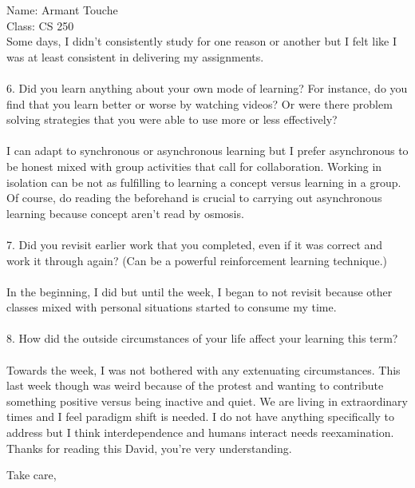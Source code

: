 \documentclass{letter}
\begin{document}
\begin{letter}{Name: Armant Touche \\ Class: CS 250 
\\ }
Some days, I didn't consistently study for one reason or another but I felt like I was at least consistent in delivering my assignments.\\\\
6. Did you learn anything about your own mode of learning? For instance, do you find that you learn better or worse by watching videos? Or were there problem solving strategies that you were able to use more or less effectively?\\\\
I can adapt to synchronous or asynchronous learning but I prefer asynchronous to be honest mixed with group activities that call for collaboration. Working in isolation can be not as fulfilling to learning a concept versus learning in a group. Of course, do reading the beforehand is crucial to carrying out asynchronous learning because concept aren't read by osmosis.\\\\
7.  Did you revisit earlier work that you completed, even if it was correct and work it through again? (Can be a powerful reinforcement learning technique.)\\\\
In the beginning, I did but until the  week, I began to not revisit because other classes mixed with personal situations started to consume my time.\\\\
8. How did the outside circumstances of your life affect your learning this term?\\\\
Towards the  week, I was not bothered with any extenuating circumstances. This last week though was weird because of the protest and wanting to contribute something positive versus being inactive and quiet. We are living in extraordinary times and I feel paradigm shift is needed. I do not have anything specifically to address but I think interdependence and humans interact needs reexamination. Thanks for reading this David, you're very understanding.


\closing{Take care,}

\end{letter}
\end{document}
